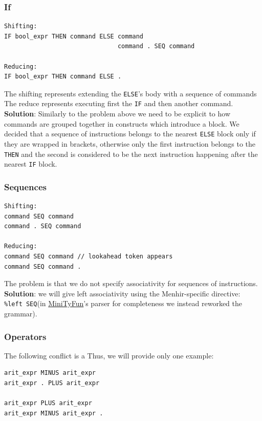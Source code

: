 \documentclass[a4paper,11pt]{report}
\begin{document}
\subsubsection{If}
	\begin{lstlisting}[caption={Shift-reduce conflict with if term}, captionpos=b]
Shifting: 
IF bool_expr THEN command ELSE command 
                               command . SEQ command

Reducing: 
IF bool_expr THEN command ELSE .
	\end{lstlisting}
	The shifting represents extending the \verb|ELSE|'s body with a sequence of commands
	The reduce represents executing first the \verb|IF| and then another command.\\
	\textbf{Solution}: 
	Similarly to the problem above we need to be explicit to how commands are grouped together in constructs which introduce a block. We decided that a sequence of instructions belongs to the nearest \verb|ELSE| block only if they are wrapped in brackets, otherwise only the first instruction belongs to the \verb|THEN| and the second is considered to be the next instruction happening after the nearest \verb|IF| block.	
	\subsubsection {Sequences}
	
	\begin{lstlisting}[caption={Conflict on the associativity of sequences}, captionpos=b]
Shifting:
command SEQ command 
command . SEQ command 

Reducing:
command SEQ command // lookahead token appears
command SEQ command .
	\end{lstlisting}
	
	The problem is that we do not specify associativity for sequences of instructions.\\
	\textbf{Solution}: we will give left associativity using the Menhir-specific directive:\\
	\verb|%left SEQ|(in \hyperref[Section::TyFun]{MiniTyFun}'s parser for completeness we instead reworked the grammar).
	
	\subsubsection {Operators}
	The following conflict is a 
	Thus, we will provide only one example:
	
	\begin{lstlisting}
arit_expr MINUS arit_expr 
arit_expr . PLUS arit_expr 

arit_expr PLUS arit_expr
arit_expr MINUS arit_expr .
	\end{lstlisting}
	
\end{document}
